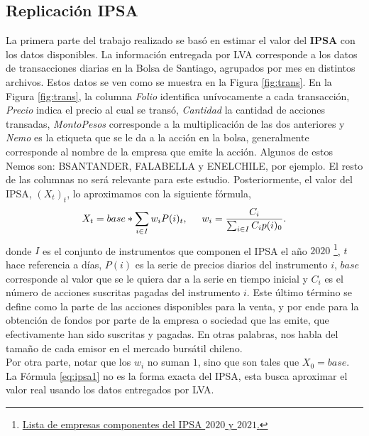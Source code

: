 \documentclass{article}
\begin{document}
\subsection{Replicación IPSA}
   	La primera parte del trabajo realizado se basó en estimar el valor del \textbf{IPSA} con los datos disponibles. La información entregada por LVA corresponde a los datos de transacciones diarias en la Bolsa de Santiago, agrupados por mes en distintos archivos. Estos datos se ven como se muestra en la Figura \ref{fig:trans}.
   	En la Figura \ref{fig:trans}, la columna \textit{Folio} identifica unívocamente a cada transacción, \textit{Precio} indica el precio al cual se transó,  \textit{Cantidad} la cantidad de acciones transadas, \textit{MontoPesos} corresponde a la multiplicación de las dos anteriores y \textit{Nemo} es la etiqueta que se le da a la acción en la bolsa, generalmente corresponde al nombre de la empresa que emite la acción. Algunos de estos Nemos son: BSANTANDER, FALABELLA y ENELCHILE, por ejemplo. El resto de las columnas no será relevante para este estudio. Posteriormente, el valor del IPSA, $(X_t)_t$, lo aproximamos con la siguiente fórmula,
   	\begin{align}
   		\label{eq:ipsa1}
		X_t = base*\sum_{i\in I} w_i P(i)_t, \hspace{.5cm}
		w_i = \frac{C_i}{\sum_{i\in I} C_ip(i)_0}.
   	\end{align}
   donde $I$ es el conjunto de instrumentos que componen el IPSA el año $2020$ \footnote{\href{https://www.rankia.cl/blog/analisis-ipsa/3229498-que-empresas-forman-parte-ipsa-2021}{Lista de empresas componentes del IPSA $2020$ y $2021$.}}, $t$ hace referencia a días, $P(i)$ es la serie de precios diarios del instrumento $i$, $base$ corresponde al valor que se le quiera dar a la serie en tiempo inicial y $C_i$ es el número de acciones suscritas pagadas del instrumento $i$. Este último término se define como la parte de las acciones disponibles para la venta, y por ende para la obtención de fondos por parte de la empresa o sociedad que las emite, que efectivamente han sido suscritas y pagadas. En otras palabras, nos habla del tamaño de cada emisor en el mercado bursátil chileno.\\
   Por otra parte, notar que los  $w_i$ no suman $1$, sino que son tales que $X_0=base$. La Fórmula \ref{eq:ipsa1} no es la forma exacta del IPSA, esta busca aproximar el valor real usando los datos entregados por LVA.
   	
\end{document}
